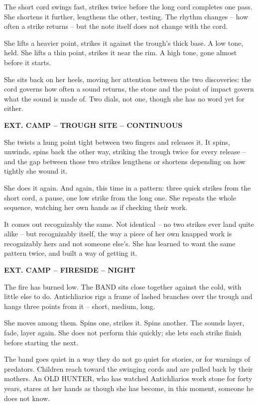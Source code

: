 \documentclass[12pt]{article}
\newcommand{\sceneheading}[1]{%
  \bigskip\noindent\textbf{#1}\par\smallskip
}
\newcommand{\action}[1]{%
  \noindent #1\par\medskip
}
\begin{document}
\action{The short cord swings fast, strikes twice before the long cord completes one pass. She shortens it further, lengthens the other, testing. The rhythm changes -- how often a strike returns -- but the note itself does not change with the cord.}

\action{She lifts a heavier point, strikes it against the trough's thick base. A low tone, held. She lifts a thin point, strikes it near the rim. A high tone, gone almost before it starts.}

\action{She sits back on her heels, moving her attention between the two discoveries: the cord governs how often a sound returns, the stone and the point of impact govern what the sound is made of. Two dials, not one, though she has no word yet for either.}

\sceneheading{EXT. CAMP -- TROUGH SITE -- CONTINUOUS}

\action{She twists a hung point tight between two fingers and releases it. It spins, unwinds, spins back the other way, striking the trough twice for every release -- and the gap between those two strikes lengthens or shortens depending on how tightly she wound it.}

\action{She does it again. And again, this time in a pattern: three quick strikes from the short cord, a pause, one low strike from the long one. She repeats the whole sequence, watching her own hands as if checking their work.}

\action{It comes out recognizably the same. Not identical -- no two strikes ever land quite alike -- but recognizably itself, the way a piece of her own knapped work is recognizably hers and not someone else's. She has learned to want the same pattern twice, and built a way of getting it.}

\sceneheading{EXT. CAMP -- FIRESIDE -- NIGHT}

\action{The fire has burned low. The BAND sits close together against the cold, with little else to do. Antichliarios rigs a frame of lashed branches over the trough and hangs three points from it -- short, medium, long.}

\action{She moves among them. Spins one, strikes it. Spins another. The sounds layer, fade, layer again. She does not perform this quickly; she lets each strike finish before starting the next.}

\action{The band goes quiet in a way they do not go quiet for stories, or for warnings of predators. Children reach toward the swinging cords and are pulled back by their mothers. An OLD HUNTER, who has watched Antichliarios work stone for forty years, stares at her hands as though she has become, in this moment, someone he does not know.}
\end{document}
